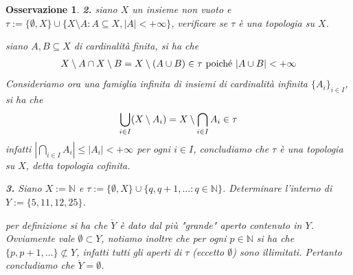 \documentclass[oneside, 11pt]{amsbook}
\makeatletter
\newcommand{\0}{{(0)}}
\newcommand{\3}{{(3)}}
\theoremstyle{colonplain}
\theoremstyle{colondefinition}
\theoremstyle{colonremark}
\newtheorem{rmk}[thm]{Osservazione}
\numberwithin{equation}{chapter}
\renewcommand{\proofname}{Dimostrazione}
\renewenvironment{proof}[1][\proofname]{\par
  \pushQED{\end{proof}}%
  \normalfont \topsep6\p@\@plus6\p@\relax
  \trivlist
  \item[\hskip\labelsep\bfseries #1:]\ignorespaces
}{%
  \popQED\endtrivlist\@endpefalse
}
\makeatother
\begin{document}
\begin{rmk}
\textbf{2.} siano $X$ un insieme non vuoto e $\tau := \{ \emptyset, X \} \cup \{ X \setminus A : A \subseteq X, |A| < +\infty \}$, verificare se $\tau$ è una topologia su $X$.
\begin{proof}[Soluzione]
siano $A, B \subseteq X$ di cardinalità finita, si ha che
\begin{align}
    X \setminus A \cap X \setminus B = X \setminus (A \cup B) \in \tau \text{ poiché } |A \cup B| < +\infty \notag
\end{align}Consideriamo ora una famiglia infinita di insiemi di cardinalità infinita $\{ A_i \}_{i \in I}$, si ha che
\begin{align}
    \bigcup_{i \in I} (X \setminus A_i) = X \setminus \bigcap_{i \in I} A_i \in \tau \notag
\end{align}
infatti $|\bigcap_{i \in I} A_i| \leq |A_i| < +\infty$ per ogni $i \in I$, concludiamo che $\tau$ è una topologia su $X$, detta \textit{topologia cofinita}.
\end{proof}

\textbf{3.} Siano $X := \mathbb{N}$ e $\tau := \{ \emptyset, X \} \cup \{q, q+1, \dots : q \in \mathbb{N} \}$. Determinare l'interno di $Y := \{ 5, 11, 12, 25 \}$.
\begin{proof}[Soluzione] 
per definizione si ha che $\mathring{Y}$ è dato dal più "grande" aperto contenuto in $Y$. Ovviamente vale $\emptyset \subset Y$, notiamo inoltre che per ogni $p \in \mathbb{N}$ si ha che $\{ p, p+1, \dots \} \not\subset Y$, infatti tutti gli aperti di $\tau$ (eccetto $\emptyset$) sono illimitati. Pertanto concludiamo che $\mathring{Y} = \emptyset$.
\end{proof}


\end{rmk}
\end{document}
